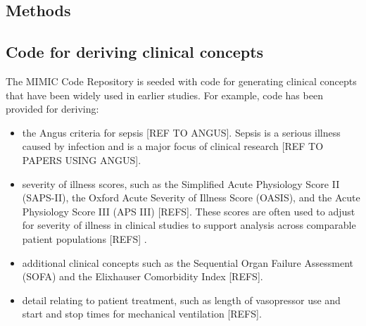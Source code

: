 \documentclass{bioinfo}
\begin{document}

\begin{methods}
\section{Methods}

\subsection{Code for deriving clinical concepts}

The MIMIC Code Repository is seeded with code for generating clinical concepts that have been widely used in earlier studies. For example, code has been provided for deriving:

\begin{itemize}
\item the Angus criteria for sepsis [REF TO ANGUS]. Sepsis is a serious illness caused by infection and is a major focus of clinical research [REF TO PAPERS USING ANGUS].
\item severity of illness scores, such as the Simplified Acute Physiology Score II (SAPS-II), the Oxford Acute Severity of Illness Score (OASIS), and the Acute Physiology Score III (APS III) [REFS]. These scores are often used to adjust for severity of illness in clinical studies to support analysis across comparable patient populations [REFS] .
\item additional clinical concepts such as the Sequential Organ Failure Assessment (SOFA) and the Elixhauser Comorbidity Index [REFS].
\item detail relating to patient treatment, such as length of vasopressor use and start and stop times for mechanical ventilation [REFS].
\end{itemize}





\end{methods}
\end{document}
